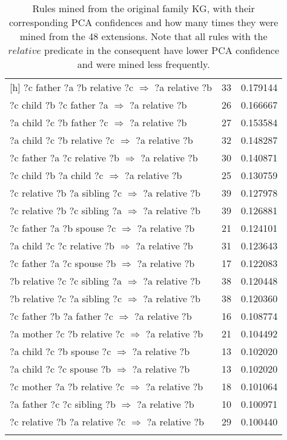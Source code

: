 \begin{longtable}{lrr}[h]
  ?c  father  ?a  ?b  relative  ?c   $\Rightarrow$ ?a  relative  ?b &           33 &        0.179144 \\
     ?c  child  ?b  ?c  father  ?a   $\Rightarrow$ ?a  relative  ?b &           26 &        0.166667 \\
     ?a  child  ?c  ?b  father  ?c   $\Rightarrow$ ?a  relative  ?b &           27 &        0.153584 \\
   ?a  child  ?c  ?b  relative  ?c   $\Rightarrow$ ?a  relative  ?b &           32 &        0.148287 \\
  ?c  father  ?a  ?c  relative  ?b   $\Rightarrow$ ?a  relative  ?b &           30 &        0.140871 \\
      ?c  child  ?b  ?a  child  ?c   $\Rightarrow$ ?a  relative  ?b &           25 &        0.130759 \\
 ?c  relative  ?b  ?a  sibling  ?c   $\Rightarrow$ ?a  relative  ?b &           39 &        0.127978 \\
 ?c  relative  ?b  ?c  sibling  ?a   $\Rightarrow$ ?a  relative  ?b &           39 &        0.126881 \\
    ?c  father  ?a  ?b  spouse  ?c   $\Rightarrow$ ?a  relative  ?b &           21 &        0.124101 \\
   ?a  child  ?c  ?c  relative  ?b   $\Rightarrow$ ?a  relative  ?b &           31 &        0.123643 \\
    ?c  father  ?a  ?c  spouse  ?b   $\Rightarrow$ ?a  relative  ?b &           17 &        0.122083 \\
 ?b  relative  ?c  ?c  sibling  ?a   $\Rightarrow$ ?a  relative  ?b &           38 &        0.120448 \\
 ?b  relative  ?c  ?a  sibling  ?c   $\Rightarrow$ ?a  relative  ?b &           38 &        0.120360 \\
    ?c  father  ?b  ?a  father  ?c   $\Rightarrow$ ?a  relative  ?b &           16 &        0.108774 \\
  ?a  mother  ?c  ?b  relative  ?c   $\Rightarrow$ ?a  relative  ?b &           21 &        0.104492 \\
     ?a  child  ?c  ?b  spouse  ?c   $\Rightarrow$ ?a  relative  ?b &           13 &        0.102020 \\
     ?a  child  ?c  ?c  spouse  ?b   $\Rightarrow$ ?a  relative  ?b &           13 &        0.102020 \\
  ?c  mother  ?a  ?b  relative  ?c   $\Rightarrow$ ?a  relative  ?b &           18 &        0.101064 \\
   ?a  father  ?c  ?c  sibling  ?b   $\Rightarrow$ ?a  relative  ?b &           10 &        0.100971 \\
?c  relative  ?b  ?a  relative  ?c   $\Rightarrow$ ?a  relative  ?b &           29 &        0.100440 \\
\bottomrule
\caption{Rules mined from the original family KG, with their corresponding PCA confidences and how many times they were mined from the 48 extensions. Note that all rules with the $relative$ predicate in the consequent have lower PCA confidence and were mined less frequently.}
\label{family_original_rules_table_PCA}
\end{longtable}



